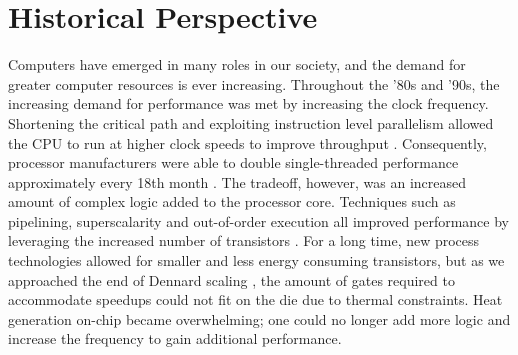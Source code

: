 \section{Historical Perspective}

Computers have emerged in many roles in our society, and the demand for greater
computer resources is ever increasing. Throughout the '80s and '90s, the
increasing demand for performance was met by increasing the clock frequency.
Shortening the critical path and exploiting instruction level parallelism
allowed the CPU to run at higher clock speeds to improve throughput
\cite{tanenbaum1984structured}. Consequently, processor manufacturers were able
to double single-threaded performance approximately every 18th month
\cite{moore1965cramming}. The tradeoff, however, was an increased amount of
complex logic added to the processor core. Techniques such as pipelining,
superscalarity and out-of-order execution all improved performance by leveraging
the increased number of transistors \cite{patterson}. For a long time, new
process technologies allowed for smaller and less energy consuming transistors,
but as we approached the end of Dennard scaling
\cite{dennard1974design,esmaeilzadeh2011dark}, the amount of gates required to
accommodate speedups could not fit on the die due to thermal constraints. Heat
generation on-chip became overwhelming; one could no longer add more logic and
increase the frequency to gain additional performance.


